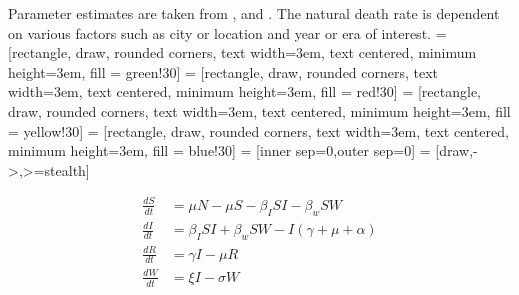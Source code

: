 \documentclass[12pt]{article}\usepackage[]{graphicx}\usepackage[]{color}
\begin{document}
Parameter estimates are taken from \cite{link5}, \cite{link8} and \cite{link3}.
The natural death rate is dependent on various factors such as city or location and year or era of interest.
 = [rectangle, draw, rounded corners, text width=3em, text centered, minimum height=3em, fill = green!30]
 = [rectangle, draw, rounded corners, text width=3em, text centered, minimum height=3em, fill = red!30]
 = [rectangle, draw, rounded corners, text width=3em, text centered, minimum height=3em, fill = yellow!30]
 = [rectangle, draw, rounded corners, text width=3em, text centered, minimum height=3em, fill = blue!30]
 = [inner sep=0,outer sep=0]
 = [draw,->,>=stealth]
\begin{center}
\end{center}
\begin{align*}
    \frac{dS}{dt}&= \mu N - \mu S - \beta_I SI - \beta_w S W  \\
    \frac{dI}{dt}&= \beta_I S I + \beta_w S W - I (\gamma + \mu + \alpha) \\
    \frac{dR}{dt}&= \gamma I - \mu R \\
    \frac{dW}{dt}&= \xi I  - \sigma W
\end{align*}
\end{document}
